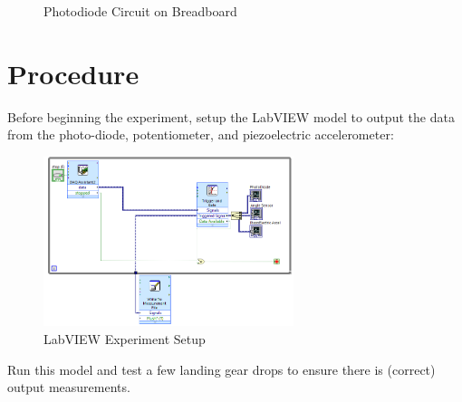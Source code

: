 \documentclass{article}
\begin{document}
\begin{itemize}
\begin{figure}[H]
    \centering
    \caption{Photodiode Circuit on Breadboard}
    \label{fig:diodecircuit}
\end{figure}

\end{itemize}

\section{Procedure}
Before beginning the experiment, setup the LabVIEW model to output the data from the photo-diode, potentiometer, and piezoelectric accelerometer:

\begin{figure}[H]
    \centering
    \includegraphics[width=0.65\textwidth]{lab8images/lab8blockdiag.PNG}
    \caption{LabVIEW Experiment Setup}
    \label{fig:labview}
\end{figure}

Run this model and test a few landing gear drops to ensure there is (correct) output measurements. 
\end{document}
